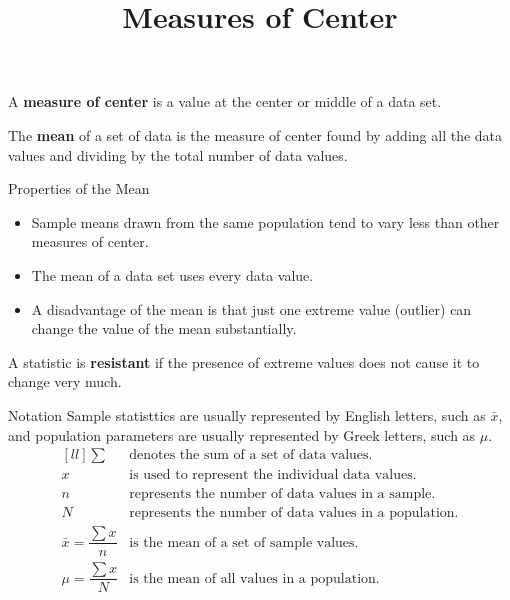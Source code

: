 \documentclass{beamer}
\title[MA205 - Section 3.1]{Measures of Center}
\begin{document}
\begin{frame}
\titlepage
\end{frame}

\begin{frame}
\begin{definition}
A \textbf{measure of center} is a value at the center or middle of a data set.
\end{definition}\pause

\begin{definition}
The \textbf{mean} of a set of data is the measure of center found by adding all the data values and dividing by the total number of data values.
\end{definition}\pause

\begin{block}{Properties of the Mean}
\begin{itemize}
\item Sample means drawn from the same population tend to vary less than other measures of center.\pause
\item The mean of a data set uses every data value.\pause
\item A disadvantage of the mean is that just one extreme value (outlier) can change the value of the mean substantially.
\end{itemize}
\end{block}\pause

\begin{definition}
A statistic is \textbf{resistant} if the presence of extreme values does not cause it to change very much.
\end{definition}
\end{frame}

\begin{frame}
\begin{block}{Notation}
Sample statisttics are usually represented by English letters, such as $\bar{x}$, and population parameters are usually represented by Greek letters, such as $\mu$.
{\renewcommand*{\arraystretch}{2.25}
\begin{equation*}
\begin{matrix}[ll]
\sum & \text{denotes the sum of a set of data values.} \\
x & \text{is used to represent the individual data values.} \\
n & \text{represents the number of data values in a sample.} \\
N & \text{represents the number of data values in a population.} \\
\bar{x}=\dfrac{\sum x}{n} & \text{is the mean of a set of sample values.} \\
\mu = \dfrac{\sum x}{N} & \text{is the mean of all values in a population.}
\end{matrix}
\end{equation*}}
\end{block}
\end{frame}
\end{document}
